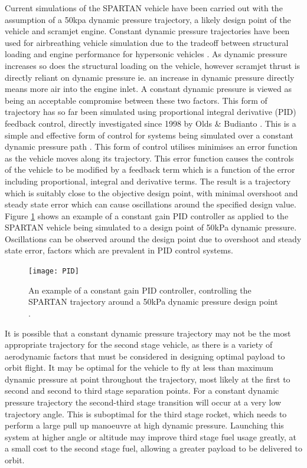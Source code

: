 Current simulations of the SPARTAN vehicle have been carried out with the assumption of a 50kpa dynamic pressure trajectory, a likely design point of the vehicle and scramjet engine. 
 Constant dynamic pressure trajectories have been used for airbreathing vehicle simulation due to the tradeoff between structural loading and engine performance for hypersonic vehicles \cite{Olds1998} . As dynamic pressure increases so does the structural loading on the vehicle, however scramjet thrust is directly reliant on dynamic pressure ie. an increase in dynamic pressure directly means more air into the engine inlet. A constant dynamic pressure is viewed as being an acceptable compromise between these two factors.   
This form of trajectory has so far been simulated using proportional integral derivative (PID) feedback control, directly investigated since 1998 by Olds \& Budianto \cite{Olds1998}. This is a simple and effective form of control for systems being simulated over a constant dynamic pressure path \cite{Preller2015}. This form of control utilises minimises an error function as the vehicle moves along its trajectory. This error function causes the controls of the vehicle to be modified by a feedback term which is a function of the error including proportional, integral and derivative terms. The result is a trajectory which is suitably close to the objective design point, with minimal overshoot and steady state error which can cause oscillations around the specified design value. Figure \ref{fig:PID} shows an example of a constant gain PID controller as applied to the SPARTAN vehicle being simulated to a design point of 50kPa dynamic pressure. Oscillations can be observed around the design point due to overshoot and steady state error, factors which are prevalent in PID control systems.

\begin{figure}[ht]
	\centering
	\texttt{[image: PID]}
	\caption{An example of a constant gain PID controller, controlling the SPARTAN trajectory around a 50kPa dynamic pressure design point \cite{Preller2015}.}
	\label{fig:PID}
\end{figure}


It is possible that a constant dynamic pressure trajectory may not be the most appropriate trajectory for the second stage vehicle, as there is a variety of aerodynamic factors that must be considered in designing optimal payload to orbit flight. It may be optimal for the vehicle to fly at less than maximum dynamic pressure at point throughout the trajectory, most likely at the first to second and second to third stage separation points. For a constant dynamic pressure trajectory the second-third stage transition will occur at a very low trajectory angle. This is suboptimal for the third stage rocket, which needs to perform a large pull up manoeuvre at high dynamic pressure. Launching this system at higher angle or altitude may improve third stage fuel usage greatly, at a small cost to the second stage fuel, allowing a greater payload to be delivered to orbit. 

